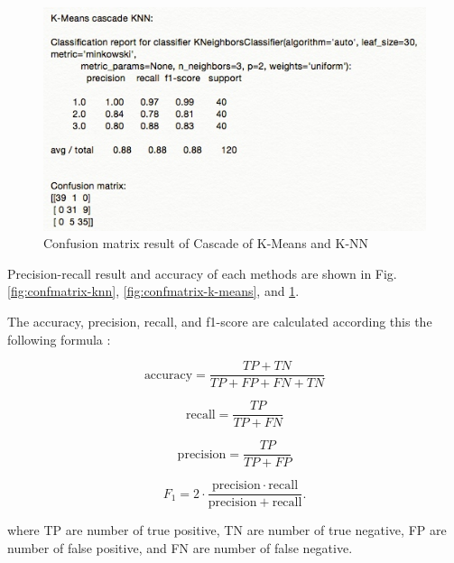 \documentclass[conference]{IEEEtran}
\begin{document}
\begin{figure}[!t]
\centering
\includegraphics[width=3.2 in]{confmat_cascade.jpg}
\caption{Confusion matrix result of Cascade of K-Means and K-NN}
\label{fig:confmatrix-cascade}
\end{figure}



Precision-recall result and accuracy of each methods are shown in Fig. \ref{fig:confmatrix-knn}, \ref{fig:confmatrix-k-means}, and \ref{fig:confmatrix-cascade}. 

The accuracy, precision, recall, and f1-score are calculated according this the following formula \cite{Olson2008}:\newline

\begin{equation}
\text{accuracy} = \frac{TP+TN}{TP+FP+FN+TN} 
\end{equation}

\begin{equation}
\text{recall} = \frac{TP}{TP+FN} 
\end{equation}

\begin{equation}
\text{precision}=\frac{TP}{TP+FP}
\end{equation}

\begin{equation}
F_1 = 2 \cdot \frac{\mathrm{precision} \cdot \mathrm{recall}}{\mathrm{precision} + \mathrm{recall}}.
\end{equation}

where TP are number of true positive, TN are number of true negative, FP are number of false positive, and FN are number of false negative.



\end{document}
